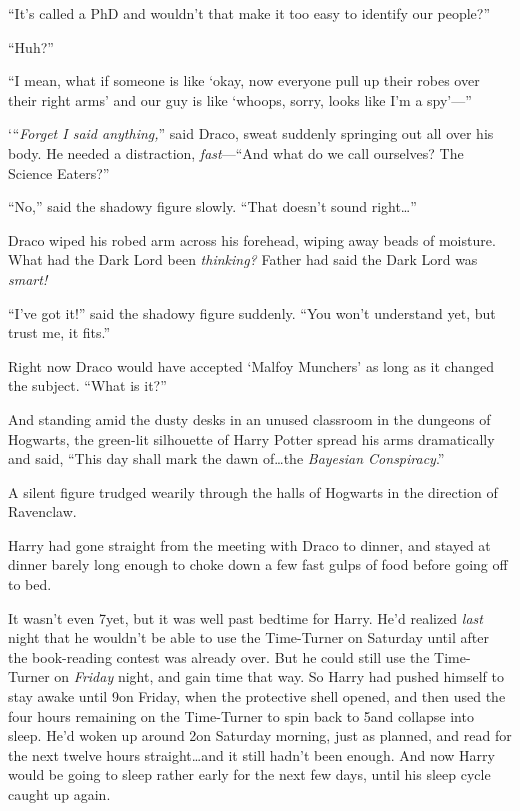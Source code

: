 “It’s called a PhD and wouldn’t that make it too easy to identify our people?”

“Huh?”

“I mean, what if someone is like ‘okay, now everyone pull up their robes over their right arms’ and our guy is like ‘whoops, sorry, looks like I’m a spy’—”

‘“\emph{Forget I said anything,}” said Draco, sweat suddenly springing out all over his body. He needed a distraction, \emph{fast}—“And what do we call ourselves? The Science Eaters?”

“No,” said the shadowy figure slowly. “That doesn’t sound right…”

Draco wiped his robed arm across his forehead, wiping away beads of moisture. What had the Dark Lord been \emph{thinking?} Father had said the Dark Lord was \emph{smart!}

“I’ve got it!” said the shadowy figure suddenly. “You won’t understand yet, but trust me, it fits.”

Right now Draco would have accepted ‘Malfoy Munchers’ as long as it changed the subject. “What is it?”

And standing amid the dusty desks in an unused classroom in the dungeons of Hogwarts, the green-lit silhouette of Harry Potter spread his arms dramatically and said, “This day shall mark the dawn of…the \emph{Bayesian Conspiracy}.”

\later

A silent figure trudged wearily through the halls of Hogwarts in the direction of Ravenclaw.

Harry had gone straight from the meeting with Draco to dinner, and stayed at dinner barely long enough to choke down a few fast gulps of food before going off to bed.

It wasn’t even 7\pm yet, but it was well past bedtime for Harry. He’d realized \emph{last} night that he wouldn’t be able to use the Time-Turner on Saturday until after the book-reading contest was already over. But he could still use the Time-Turner on \emph{Friday} night, and gain time that way. So Harry had pushed himself to stay awake until 9\pm on Friday, when the protective shell opened, and then used the four hours remaining on the Time-Turner to spin back to 5\pm and collapse into sleep. He’d woken up around 2\am on Saturday morning, just as planned, and read for the next twelve hours straight…and it still hadn’t been enough. And now Harry would be going to sleep rather early for the next few days, until his sleep cycle caught up again.

